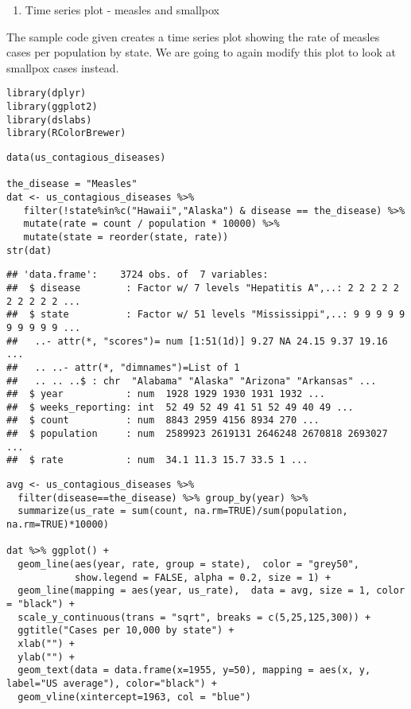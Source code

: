\documentclass[]{article}
\providecommand{\tightlist}{%
  \setlength{\itemsep}{0pt}\setlength{\parskip}{0pt}}
\begin{document}
\begin{enumerate}
\def\labelenumi{\arabic{enumi}.}
\setcounter{enumi}{1}
\tightlist
\item
  Time series plot - measles and smallpox
\end{enumerate}

The sample code given creates a time series plot showing the rate of
measles cases per population by state. We are going to again modify this
plot to look at smallpox cases instead.

\begin{verbatim}
library(dplyr)
library(ggplot2)
library(dslabs)
library(RColorBrewer)
\end{verbatim}

\begin{verbatim}
data(us_contagious_diseases)

the_disease = "Measles"
dat <- us_contagious_diseases %>%
   filter(!state%in%c("Hawaii","Alaska") & disease == the_disease) %>%
   mutate(rate = count / population * 10000) %>%
   mutate(state = reorder(state, rate))
str(dat)
\end{verbatim}

\begin{verbatim}
## 'data.frame':    3724 obs. of  7 variables:
##  $ disease        : Factor w/ 7 levels "Hepatitis A",..: 2 2 2 2 2 2 2 2 2 2 ...
##  $ state          : Factor w/ 51 levels "Mississippi",..: 9 9 9 9 9 9 9 9 9 9 ...
##   ..- attr(*, "scores")= num [1:51(1d)] 9.27 NA 24.15 9.37 19.16 ...
##   .. ..- attr(*, "dimnames")=List of 1
##   .. .. ..$ : chr  "Alabama" "Alaska" "Arizona" "Arkansas" ...
##  $ year           : num  1928 1929 1930 1931 1932 ...
##  $ weeks_reporting: int  52 49 52 49 41 51 52 49 40 49 ...
##  $ count          : num  8843 2959 4156 8934 270 ...
##  $ population     : num  2589923 2619131 2646248 2670818 2693027 ...
##  $ rate           : num  34.1 11.3 15.7 33.5 1 ...
\end{verbatim}

\begin{verbatim}
avg <- us_contagious_diseases %>%
  filter(disease==the_disease) %>% group_by(year) %>%
  summarize(us_rate = sum(count, na.rm=TRUE)/sum(population, na.rm=TRUE)*10000)

dat %>% ggplot() +
  geom_line(aes(year, rate, group = state),  color = "grey50", 
            show.legend = FALSE, alpha = 0.2, size = 1) +
  geom_line(mapping = aes(year, us_rate),  data = avg, size = 1, color = "black") +
  scale_y_continuous(trans = "sqrt", breaks = c(5,25,125,300)) + 
  ggtitle("Cases per 10,000 by state") + 
  xlab("") + 
  ylab("") +
  geom_text(data = data.frame(x=1955, y=50), mapping = aes(x, y, label="US average"), color="black") + 
  geom_vline(xintercept=1963, col = "blue")
\end{verbatim}
\end{document}
